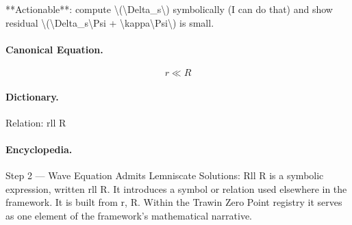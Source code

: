 **Actionable**: compute \textbackslash{}(\textbackslash{}Delta\_s\textbackslash{}) symbolically (I can do that) and show residual \textbackslash{}(\textbackslash{}Delta\_s\textbackslash{}Psi + \textbackslash{}kappa\textbackslash{}Psi\textbackslash{}) is small.

\paragraph{Canonical Equation.}
\[
r\ll R
\]

\paragraph{Dictionary.}
Relation: rll R

\paragraph{Encyclopedia.}
Step 2 — Wave Equation Admits Lemniscate Solutions: Rll R is a symbolic expression, written rll R. It introduces a symbol or relation used elsewhere in the framework. It is built from r, R. Within the Trawin Zero Point registry it serves as one element of the framework's mathematical narrative.
